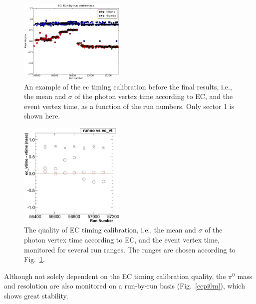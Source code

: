 \begin{figure}[h]
\begin{center}
 \includegraphics[width=0.45\textwidth]{figures/calib/ec/ec_vtimebyrunsec.eps}
  \caption{An example of the ec timing calibration before the final results, i.e., the mean and $\sigma$ of the photon vertex time according to EC, and the event vertex time, as a function of the run numbers. Only sector 1 is shown here.}
  \label{ectrunsec}
  \end{center}
\end{figure}

\begin{figure}[h]
\begin{center}
 \includegraphics[width=0.45\textwidth]{figures/calib/ec/ec_vtimebyrun.eps}
  \caption{The quality of EC timing calibration, i.e., the mean and $\sigma$ of the photon vertex time according to EC, and the event vertex time, monitored for several run ranges. The ranges are chosen according to Fig.~\ref{ectrunsec}.}
  \label{ectrun}
  \end{center}
\end{figure}

Although not solely dependent on the EC timing calibration quality, the $\pi^0$ mass and resolution are also monitored on a run-by-run basis (Fig.~\ref{ecpi0m}), which shows great stability.

